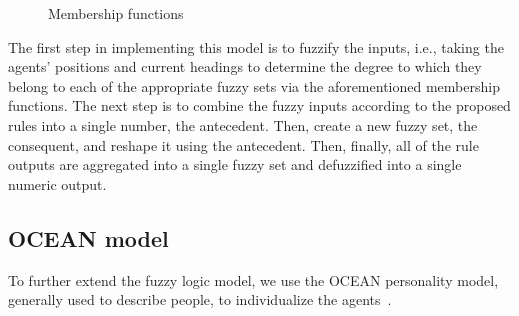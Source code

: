 \documentclass[9pt]{pnas-new}
\begin{document}
\begin{figure}[ht]\centering
    \caption{Membership functions}
    \label{membership}
\end{figure}

The first step in implementing this model is to fuzzify the inputs, i.e., taking the agents' positions and current headings to determine the degree to which they belong to each of the appropriate fuzzy sets via the aforementioned membership functions.
The next step is to combine the fuzzy inputs according to the proposed rules into a single number, the antecedent. Then, create a new fuzzy set, the consequent, and reshape it using the antecedent.
Then, finally, all of the rule outputs are aggregated into a single fuzzy set and defuzzified into a single numeric output.

\subsection{OCEAN model}
To further extend the fuzzy logic model, we use the OCEAN personality model, generally used to describe people, to individualize the agents~\cite{fuzzylogic}. 
\end{document}
